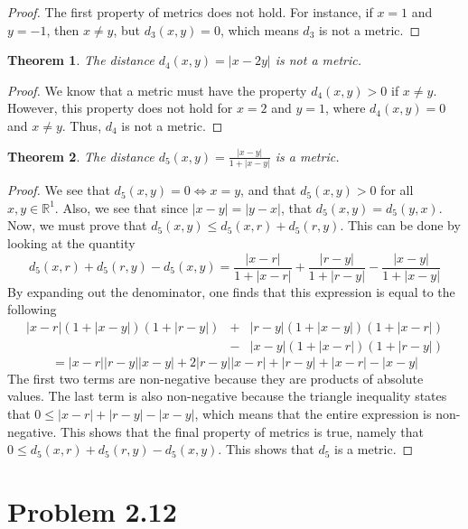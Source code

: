 \documentclass[psamsfonts]{amsart}
\newtheorem{thm}{Theorem}[section]
\theoremstyle{definition}
\theoremstyle{remark}
\numberwithin{equation}{section}
\begin{document}
\begin{proof}
The first property of metrics does not hold. For instance, if $x = 1$ and $y = -1$, then $x \neq y$, but $d_3(x,y) = 0$, which means $d_3$ is not a metric.
\end{proof}

\begin{thm}
The distance $d_4(x,y) = |x-2y|$ is not a metric.
\end{thm}

\begin{proof}
We know that a metric must have the property $d_4(x,y) > 0$ if $x \neq y$. However, this property does not hold for $x = 2$ and $y = 1$, where $d_4(x,y) = 0$ and $x \neq y$. Thus, $d_4$ is not a metric.
\end{proof}

\begin{thm} 
The distance $d_5(x,y) = \frac{ |x-y|} {1 + |x-y|}$ is a metric. 
\end{thm}

\begin{proof}
We see that $d_5(x,y) = 0 \iff x = y$, and that $d_5(x,y) > 0 $ for all $x,y \in \mathbb{R}^1$. Also, we see that since $|x-y| = |y-x|$, that $d_5(x,y) = d_5(y,x)$. Now, we must prove that $d_5(x,y) \leq d_5(x,r) + d_5(r,y)$. This can be done by looking at the quantity
\begin{equation}
d_5(x,r) + d_5(r,y) - d_5(x,y) = \frac{|x-r|}{1+|x-r|} + \frac{|r-y|}{1+|r-y|} - \frac{|x-y|}{1+|x-y|}
\end{equation}
By expanding out the denominator, one finds that this expression is equal to the following
\begin{eqnarray*}
|x-r|(1+|x-y|)(1+|r-y|) &+& |r-y|(1+|x-y|)(1+|x-r|) \\
&-& |x-y|(1+|x-r|)(1+|r-y|)
\end{eqnarray*}
\begin{equation}
= |x-r||r-y||x-y| + 2|r-y||x-r| + |r-y| + |x-r| - |x-y|
\end{equation}
The first two terms are non-negative because they are products of absolute values. The last term is also non-negative because the triangle inequality states that $0 \leq |x-r| + |r-y| - |x-y|$, which means that the entire expression is non-negative. This shows that the final property of metrics is true, namely that $0 \leq d_5(x,r) + d_5(r,y) - d_5(x,y)$. This shows that $d_5$ is a metric.
\end{proof}


\section{Problem 2.12}
\end{document}
